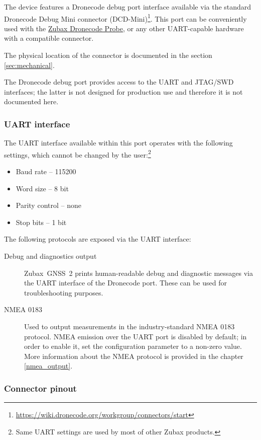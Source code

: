 \documentclass{zubaxdoc}
\begin{document}
The device features a Dronecode debug port interface available via the standard
Dronecode Debug Mini connector (DCD-Mini)\footnote{\url{https://wiki.dronecode.org/workgroup/connectors/start}}.
This port can be conveniently used with the \href{https://kb.zubax.com/x/iIAh}{Zubax Dronecode Probe},
or any other UART-capable hardware with a compatible connector.

The physical location of the connector is documented in the section \ref{sec:mechanical}.

The Dronecode debug port provides access to the UART and JTAG/SWD interfaces;
the latter is not designed for production use and therefore it is not documented here.

\subsubsection{UART interface}

The UART interface available within this port operates with the following settings,
which cannot be changed by the user:\footnote{
Same UART settings are used by most of other Zubax products.}
\begin{itemize}
    \item Baud rate -- 115200
    \item Word size -- 8 bit
    \item Parity control -- none
    \item Stop bits -- 1 bit
\end{itemize}

The following protocols are exposed via the UART interface:
\begin{description}

    \item[Debug and diagnostics output] Zubax~GNSS~2 prints human-readable debug and diagnostic messages
    via the UART interface of the Dronecode port.
    These can be used for troubleshooting purposes.

    \item[NMEA 0183] Used to output measurements in the industry-standard NMEA 0183 protocol.
    NMEA emission over the UART port is disabled by default;
    in order to enable it, set the configuration parameter  to a non-zero value.
    More information about the NMEA protocol is provided in the chapter \ref{nmea_output}.

\end{description}

\subsubsection{Connector pinout}
\end{document}
